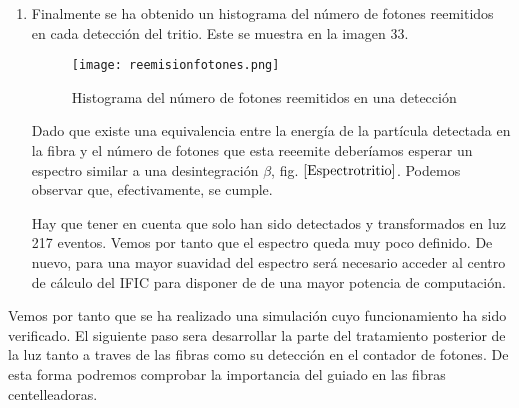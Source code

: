 \begin{enumerate}
\item{} Finalmente se ha obtenido un histograma del número de fotones reemitidos en cada detección del tritio. Este se muestra en la imagen 33.

\begin{figure}[hbtp]
\centering
\texttt{[image: reemisionfotones.png]}
\caption{Histograma del número de fotones reemitidos en una detección \label{reemision}}
\end{figure}

Dado que existe una equivalencia entre la energía de la partícula detectada en la fibra y el número de fotones que esta reeemite deberíamos esperar un espectro similar a una desintegración $\beta$, fig. $\ref{Espectrotritio}$. Podemos observar que, efectivamente, se cumple.

Hay que tener en cuenta que solo han sido detectados y transformados en luz 217 eventos. Vemos por tanto que el espectro queda muy poco definido. De nuevo, para una mayor suavidad del espectro será necesario acceder al centro de cálculo del IFIC para disponer de de una mayor potencia de computación.
\end{enumerate}

Vemos por tanto que se ha realizado una simulación cuyo funcionamiento ha sido verificado. El siguiente paso sera desarrollar la parte del tratamiento posterior de la luz tanto a traves de las fibras como su detección en el contador de fotones. De esta forma podremos comprobar la importancia del guiado en las fibras centelleadoras.